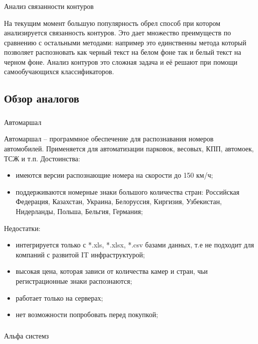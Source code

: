 \subsubsection{}
\label{sub:domain:recognition:contour_anolisys}
Анализ связанности контуров

На текущим момент большую популярность обрел способ при котором анализируется связанность контуров. Это дает множество преимуществ по сравнению с остальными методами: например это единственны метода который позволяет распозновать как черный текст на белом фоне так и белый текст на черном фоне. Анализ контуров это сложная задача и её решают при помощи самообучающихся классификаторов.  


\subsection{Обзор аналогов}
\label{sub:domain:analogs}

\subsubsection{}
\label{sub:domain:realization:automarshal}
Автомаршал 

Автомаршал – программное обеспечение для распознавания номеров автомобилей. Применяется для автоматизации парковок, весовых, КПП, автомоек, ТСЖ и т.п.\cite{auto_marshal}
Достоинства:
\begin{itemize}
  \item имеются версии распознающие номера на скорости до 150 км/ч;
  \item поддерживаются номерные знаки большого количества стран: Российская Федерация, Казахстан, Украина, Белоруссия, Киргизия, Узбекистан, Нидерланды, Польша, Бельгия, Германия;
\end{itemize}
Недостатки:
\begin{itemize}
  \item интегрируется только с *.xls, *.xlsx, *.csv базами данных, т.е не подходит для компаний с развитой IT инфраструктурой;
  \item высокая цена, которая зависи от количества камер и стран, чьи регистрационные знаки распознаются;
  \item работает только на \windows{} серверах;
  \item нет возможности попробовать перед покупкой;
\end{itemize}

\subsubsection{}
\label{sub:domain:analogs:alpha_systems}
Альфа системз

